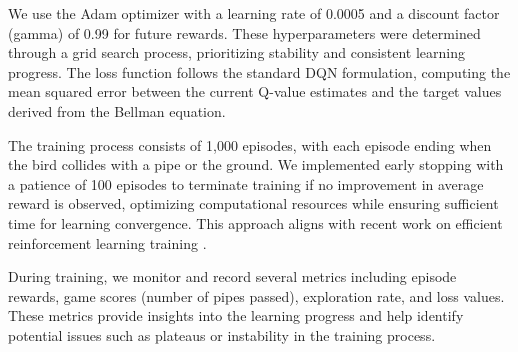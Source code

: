 We use the Adam optimizer with a learning rate of 0.0005 and a discount factor (gamma) of 0.99 for future rewards. These hyperparameters were determined through a grid search process, prioritizing stability and consistent learning progress. The loss function follows the standard DQN formulation, computing the mean squared error between the current Q-value estimates and the target values derived from the Bellman equation.

The training process consists of 1,000 episodes, with each episode ending when the bird collides with a pipe or the ground. We implemented early stopping with a patience of 100 episodes to terminate training if no improvement in average reward is observed, optimizing computational resources while ensuring sufficient time for learning convergence. This approach aligns with recent work on efficient reinforcement learning training \cite{schulman2023proximal}.

During training, we monitor and record several metrics including episode rewards, game scores (number of pipes passed), exploration rate, and loss values. These metrics provide insights into the learning progress and help identify potential issues such as plateaus or instability in the training process.
